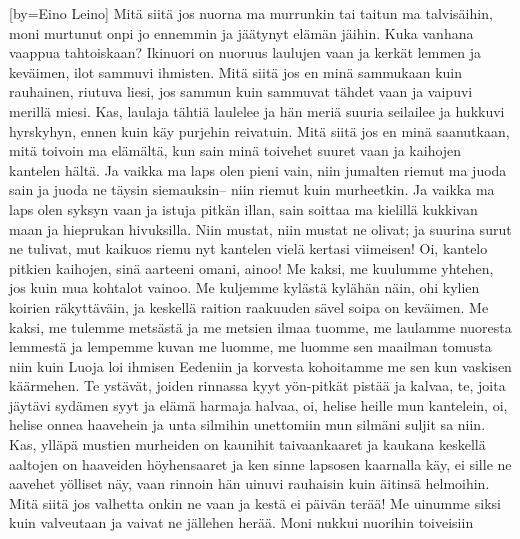 [by={Eino Leino}]
  \beginverse
    Mitä siitä jos nuorna ma murrunkin
    tai taitun ma talvisäihin,
    moni murtunut onpi jo ennemmin
    ja jäätynyt elämän jäihin.
    Kuka vanhana vaappua tahtoiskaan?
    Ikinuori on nuoruus laulujen vaan
    ja kerkät lemmen ja keväimen,
    ilot sammuvi ihmisten.
  \endverse
  \beginverse
    Mitä siitä jos en minä sammukaan
    kuin rauhainen, riutuva liesi,
    jos sammun kuin sammuvat tähdet vaan
    ja vaipuvi merillä miesi.
    Kas, laulaja tähtiä laulelee
    ja hän meriä suuria seilailee
    ja hukkuvi hyrskyhyn, ennen kuin
    käy purjehin reivatuin.
  \endverse
  \beginverse
    Mitä siitä jos en minä saanutkaan,
    mitä toivoin ma elämältä,
    kun sain minä toivehet suuret vaan
    ja kaihojen kantelen hältä.
    Ja vaikka ma laps olen pieni vain,
    niin jumalten riemut ma juoda sain
    ja juoda ne täysin siemauksin--
    niin riemut kuin murheetkin.
  \endverse
  \beginverse
    Ja vaikka ma laps olen syksyn vaan
    ja istuja pitkän illan,
    sain soittaa ma kielillä kukkivan maan
    ja hieprukan hivuksilla.
    Niin mustat, niin mustat ne olivat;
    ja suurina surut ne tulivat,
    mut kaikuos riemu nyt kantelen
    vielä kertasi viimeisen!
  \endverse
  \beginverse
    Oi, kantelo pitkien kaihojen,
    sinä aarteeni omani, ainoo!
    Me kaksi, me kuulumme yhtehen,
    jos kuin mua kohtalot vainoo.
    Me kuljemme kylästä kylähän näin,
    ohi kylien koirien räkyttäväin,
    ja keskellä raition raakuuden
    sävel soipa on keväimen.
  \endverse
  \beginverse
    Me kaksi, me tulemme metsästä
    ja me metsien ilmaa tuomme,
    me laulamme nuoresta lemmestä
    ja lempemme kuvan me luomme,
    me luomme sen maailman tomusta niin
    kuin Luoja loi ihmisen Eedeniin
    ja korvesta kohoitamme me sen
    kun vaskisen käärmehen.
  \endverse
  \beginverse
    Te ystävät, joiden rinnassa kyyt
    yön-pitkät pistää ja kalvaa,
    te, joita jäytävi sydämen syyt
    ja elämä harmaja halvaa,
    oi, helise heille mun kantelein,
    oi, helise onnea haavehein
    ja unta silmihin unettomiin
    mun silmäni suljit sa niin.
    Kas, ylläpä mustien murheiden
    on kaunihit taivaankaaret
    ja kaukana keskellä aaltojen
    on haaveiden höyhensaaret
    ja ken sinne lapsosen kaarnalla käy,
    ei sille ne aavehet yölliset näy,
    vaan rinnoin hän uinuvi rauhaisin
    kuin äitinsä helmoihin.
  \endverse
  \beginverse
    Mitä siitä jos valhetta onkin ne vaan
    ja kestä ei päivän terää!
    Me uinumme siksi kuin valveutaan
    ja vaivat ne jällehen herää.
    Moni nukkui nuorihin toiveisiin
